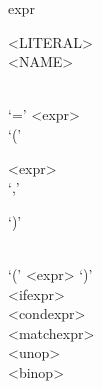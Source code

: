\documentclass[convert={outext=.png}]{standalone}
\begin{document}
\begin{málrit}{expr}
	\begin{stack}
		<LITERAL>\\
		<NAME>
		\begin{stack}\\
			`=' <expr>\\
			`('
			\begin{repnull}
				<expr>\\
				`,'
			\end{repnull}
			`)'
		\end{stack}\\
		`(' <expr> `)'\\
		<ifexpr>\\
		<condexpr>\\
		<matchexpr>\\
		<unop>\\
		<binop>
	\end{stack}
\end{málrit}
\end{document}
